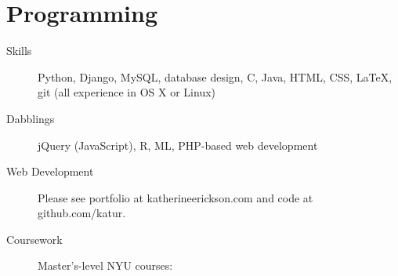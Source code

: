 \documentclass{article}
\begin{document}
	\section*{Programming}
	\begin{description}
			\item[Skills] Python, Django, MySQL, database design, C, Java, HTML, CSS, \LaTeX, git (all experience in OS X or Linux)
			\item[Dabblings] jQuery (JavaScript), R, ML, PHP-based web development
			\item[Web Development] Please see portfolio at katherineerickson.com and code at github.com/katur.
			\item[Coursework] Master's-level NYU courses:
				\footnotesize
				\begin{itemize}
				\end{itemize}
				\normalsize
	\end{description}
			
\end{document}

